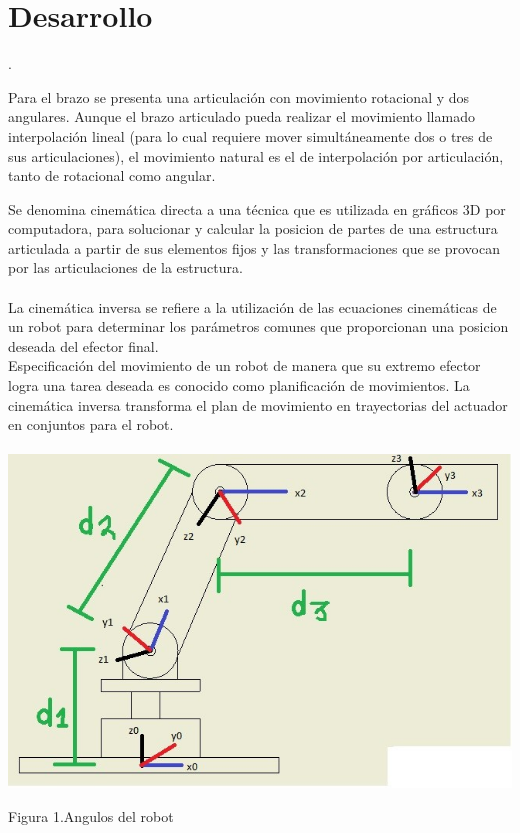 \documentclass[12pt,letterpaper]{article}
\begin{document}
\section*{Desarrollo}.
\\
\begin{flushleft}
Para el brazo se presenta una articulación con movimiento rotacional y dos angulares. Aunque el brazo articulado pueda realizar el movimiento llamado interpolación lineal (para lo cual requiere mover simultáneamente dos o tres de sus articulaciones), el movimiento natural es el de interpolación por articulación, tanto de rotacional como angular.
\\
\end{flushleft}
Se denomina cinemática directa a una técnica que es utilizada en gráficos 3D por computadora, para solucionar y calcular la posicion de partes de una estructura articulada a partir de sus elementos fijos y las transformaciones que se provocan por las articulaciones de la estructura.
\\\\
La cinemática inversa se refiere a la utilización de las ecuaciones cinemáticas de un robot
para determinar los parámetros comunes que proporcionan una posicion deseada del efector
final.
\\
Especificación del movimiento de un robot de manera que su extremo efector logra una
tarea deseada es conocido como planificación de movimientos. La cinemática inversa transforma el plan de movimiento en trayectorias del actuador en conjuntos para el robot.
\\\\
\includegraphics[scale=1]{imag6.jpg} 
\begin{center}
Figura 1.Angulos del robot
\end{center}
\end{document}
